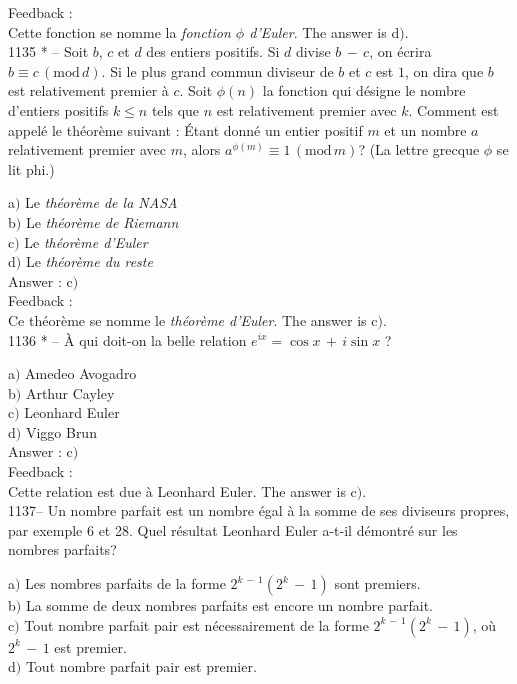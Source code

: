 ﻿\documentclass[letterpaper, 12pt]{article}
\begin{document}
Feedback : \\
Cette fonction se nomme la {\sl fonction $\phi$ d'Euler}. The answer is
d$)$. \\

1135 * -- Soit $b$, $c$ et $d$ des entiers positifs. Si $d$ divise
$b\,-\,c$, on \'ecrira $b\equiv c\,(\mathrm{mod}\,d)$. Si le plus
grand commun diviseur de $b$ et $c$ est $1$, on dira que $b$ est
relativement premier \`a $c$. Soit $\phi(n)$ la fonction qui
d\'esigne le nombre d'entiers positifs $k\le n$ tels que $n$ est
relativement premier avec $k$. Comment est appel\'e le th\'eor\`eme
suivant : \og\'Etant donn\'e un entier positif $m$ et un nombre $a$
relativement premier avec $m$, alors $a^{\phi(m)}\equiv
1\,(\mathrm{mod}\,m)$\fg ? (La lettre grecque $\phi$ se lit phi.)

a$)$ Le {\sl th\'eor\`eme de la NASA} \\
b$)$ Le {\sl th\'eor\`eme de Riemann}  \\
c$)$ Le {\sl th\'eor\`eme d'Euler}   \\
d$)$ Le {\sl th\'eor\`eme du reste}  \\

Answer : c$)$\\

Feedback : \\
Ce th\'eor\`eme se nomme le {\sl th\'eor\`eme d'Euler}. The answer is
c$)$. \\

1136 * -- \`A qui doit-on la belle relation $e^{ix}=\cos x\,+\,i\sin
x$ ?

a$)$ Amedeo Avogadro \\
b$)$ Arthur Cayley  \\
c$)$ Leonhard Euler   \\
d$)$ Viggo Brun  \\

Answer : c$)$\\

Feedback : \\
Cette relation est due \`a {Leonhard Euler}. The answer is c$)$. \\

1137-- Un nombre parfait est un nombre \'egal \`a la somme de ses
diviseurs propres, par exemple 6 et 28. Quel r\'esultat Leonhard
Euler a-t-il d\'emontr\'e sur les nombres parfaits?

a$)$ Les nombres parfaits de la forme $2^{k\,-\,1}(2^k\,-\,1)$ sont
premiers.  \\
b$)$ La somme de deux nombres parfaits est encore un nombre parfait. \\
c$)$ Tout nombre parfait pair est n\'ecessairement de la forme
$2^{k\,-\,1}(2^k\,-\,1)$, o\`u $2^k\,-\,1$ est premier. \\
d$)$ Tout nombre parfait pair est premier. \\
\end{document}
